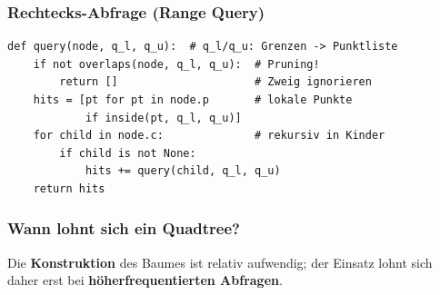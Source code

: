 \subsubsection{Rechtecks-Abfrage (Range Query)}
\begin{contentbox}
\begin{factlist}
\end{factlist}
\end{contentbox}
\begin{codebox}
\begin{lstlisting}[style=CodeExpert]
def query(node, q_l, q_u):  # q_l/q_u: Grenzen -> Punktliste
    if not overlaps(node, q_l, q_u):  # Pruning!
        return []                     # Zweig ignorieren
    hits = [pt for pt in node.p       # lokale Punkte
            if inside(pt, q_l, q_u)]
    for child in node.c:              # rekursiv in Kinder
        if child is not None:
            hits += query(child, q_l, q_u)
    return hits
\end{lstlisting}
\end{codebox}

\subsubsection{Wann lohnt sich ein Quadtree?}
\begin{statementbox}
Die \textbf{Konstruktion} des Baumes ist relativ aufwendig; der Einsatz lohnt sich daher erst bei \textbf{höherfrequentierten Abfragen}.
\end{statementbox}
